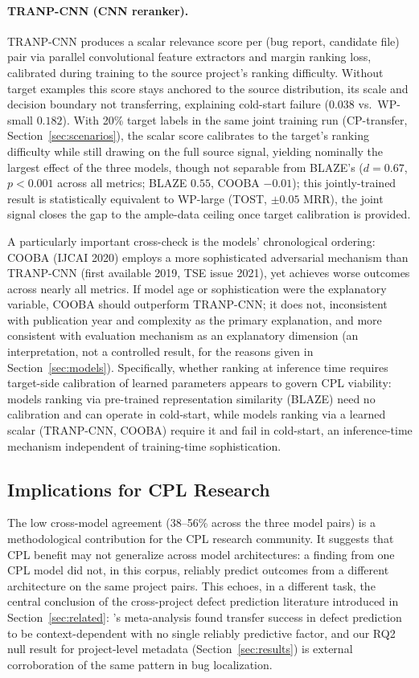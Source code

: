 \documentclass[a4paper,fleqn]{cas-dc}
\begin{document}
\paragraph{TRANP-CNN (CNN reranker).}
TRANP-CNN produces a scalar relevance score per (bug report, candidate
file) pair via parallel convolutional feature extractors and margin
ranking loss, calibrated during training to the source project's ranking
difficulty. Without target examples this score stays anchored to the
source distribution, its scale and decision boundary not transferring,
explaining cold-start failure ($0.038$ vs.\ WP-small $0.182$). With 20\%
target labels in the same joint training run (CP-transfer,
Section~\ref{sec:scenarios}), the scalar score calibrates to the target's
ranking difficulty while still drawing on the full source signal, yielding
nominally the largest effect of the three models, though not separable from
BLAZE's ($d = 0.67$, $p < 0.001$ across all metrics;
BLAZE $0.55$, COOBA $-0.01$); this jointly-trained
result is statistically equivalent to WP-large (TOST, $\pm 0.05$ MRR), the
joint signal closes the gap to the ample-data ceiling once target
calibration is provided.

A particularly important cross-check is the models' chronological
ordering: COOBA (IJCAI 2020) employs a more sophisticated adversarial
mechanism than TRANP-CNN (first available 2019, TSE issue 2021), yet
achieves worse outcomes across nearly all metrics. If model age or sophistication were the explanatory variable,
COOBA should outperform TRANP-CNN; it does not, inconsistent with
publication year and complexity as the primary explanation, and more
consistent with evaluation mechanism as an explanatory dimension (an
interpretation, not a controlled result, for the reasons given in
Section~\ref{sec:models}). Specifically, whether ranking at inference time requires
target-side calibration of learned parameters appears to govern CPL
viability: models ranking via pre-trained representation similarity
(BLAZE) need no calibration and can operate in cold-start, while models
ranking via a learned scalar (TRANP-CNN, COOBA) require it and fail in
cold-start, an inference-time mechanism independent of training-time
sophistication.

\subsection{Implications for CPL Research}

 The low cross-model agreement (38--56\% across the three model pairs) is a
methodological contribution for the CPL research community. It suggests that
CPL benefit may not generalize across model architectures: a finding
from one CPL model did not, in this corpus, reliably predict outcomes from a different architecture
on the same project pairs. This echoes, in a different task, the central conclusion of
the cross-project defect prediction literature introduced in Section~\ref{sec:related}:
\citet{hosseini2017systematic}'s meta-analysis found transfer success in defect
prediction to be context-dependent with no single reliably predictive factor,
and our RQ2 null result for project-level metadata (Section~\ref{sec:results})
is external corroboration of the same pattern in bug localization.
\end{document}
